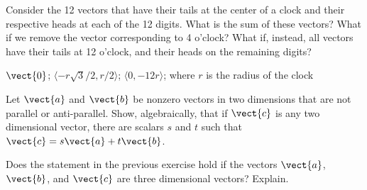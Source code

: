 \begin{enumialphparenastyle}
\begin{ex}
Consider the 12 vectors that have their tails at the center of a
clock and their respective heads at each of the 12 digits.  What is
the sum of these vectors?  What if we remove the vector corresponding
to 4 o'clock?  What if, instead, all vectors have their
tails at 12 o'clock, and their heads on the remaining digits?
\begin{sol}
$\vect{0}$; $\langle -r\sqrt3/2,r/2\rangle$; $\langle
0,-12r\rangle$; where $r$ is the radius of the clock
\end{sol}
\end{ex}

\begin{ex}
Let $\vect{a}$ and $\vect{b}$ be nonzero vectors in two dimensions
that are not parallel or anti-parallel.  Show, algebraically, that if
$\vect{c}$ is any two dimensional vector, there are scalars $s$ and $t$
such that $\vect{c}=s\vect{a}+t\vect{b}$.
\end{ex}

\begin{ex}
Does the statement in the previous exercise hold if the vectors
$\vect{a}$, $\vect{b}$, and $\vect{c}$ are three dimensional vectors? Explain.
\end{ex}

\end{enumialphparenastyle}
